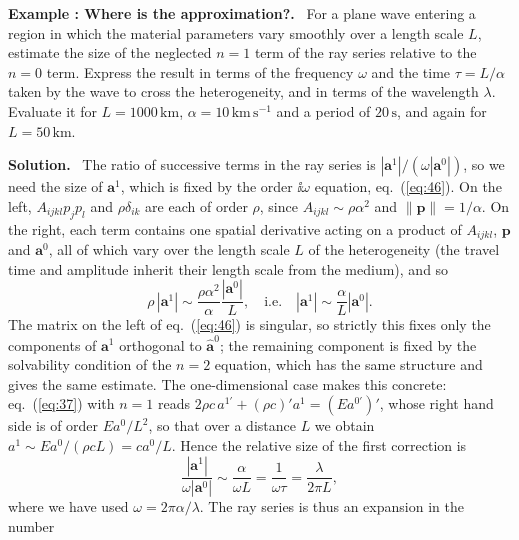 \documentclass[a4paper,12pt]{paper}
\newcounter{example}
\renewenvironment{example}[1]{%
  \refstepcounter{example}%
  \begin{mdframed}[linewidth=1pt,innertopmargin=6pt,innerbottommargin=6pt]%
  \noindent\textbf{Example \theexample: #1.}\ }{%
  \end{mdframed}}
\newenvironment{solution}{\par\noindent\textbf{Solution.}\ }{\par\medskip}
\begin{document}
\begin{example}{Where is the approximation?}
For a plane wave entering a region in which the material parameters vary smoothly over a length
scale $L$, estimate the size of the neglected $n=1$ term of the ray series relative to the $n=0$
term. Express the result in terms of the frequency $\omega$ and the time $\tau=L/\alpha$ taken by
the wave to cross the heterogeneity, and in terms of the wavelength $\lambda$. Evaluate it for
$L=1000\,\mathrm{km}$, $\alpha=10\,\mathrm{km\,s^{-1}}$ and a period of $20\,\mathrm{s}$, and again
for $L=50\,\mathrm{km}$.
\end{example}

\begin{solution}
The ratio of successive terms in the ray series is
$|\mathbf{a}^{1}|/(\omega|\mathbf{a}^{0}|)$, so we need the size of $\mathbf{a}^{1}$, which is
fixed by the order $\ii\omega$ equation, eq.~(\ref{eq:46}). On the left, $A_{ijkl}p_{j}p_{l}$ and
$\rho\delta_{ik}$ are each of order $\rho$, since $A_{ijkl}\sim\rho\alpha^{2}$ and
$\|\mathbf{p}\|=1/\alpha$. On the right, each term contains one spatial derivative acting on a
product of $A_{ijkl}$, $\mathbf{p}$ and $\mathbf{a}^{0}$, all of which vary over the length scale
$L$ of the heterogeneity (the travel time and amplitude inherit their length scale from the
medium), and so
\begin{equation}
\rho\,|\mathbf{a}^{1}|\sim\frac{\rho\alpha^{2}}{\alpha}\frac{|\mathbf{a}^{0}|}{L},\quad\text{i.e.}\quad
|\mathbf{a}^{1}|\sim\frac{\alpha}{L}|\mathbf{a}^{0}|.
\label{eq:53}
\end{equation}
The matrix on the left of eq.~(\ref{eq:46}) is singular, so strictly this fixes only the components of
$\mathbf{a}^{1}$ orthogonal to $\hat{\mathbf{a}}^{0}$; the remaining component is fixed by the
solvability condition of the $n=2$ equation, which has the same structure and gives the same
estimate. The one-dimensional case makes this concrete: eq.~(\ref{eq:37}) with $n=1$ reads
$2\rho c\,a^{1\prime}+(\rho c)'a^{1}=(Ea^{0\prime})'$, whose right hand side is of order
$Ea^{0}/L^{2}$, so that over a distance $L$ we obtain $a^{1}\sim Ea^{0}/(\rho cL)=ca^{0}/L$.
Hence the relative size of the first correction is
\begin{equation}
\frac{|\mathbf{a}^{1}|}{\omega|\mathbf{a}^{0}|}\sim\frac{\alpha}{\omega L}=\frac{1}{\omega\tau}=\frac{\lambda}{2\pi L},
\label{eq:54}
\end{equation}
where we have used $\omega=2\pi\alpha/\lambda$. The ray series is thus an expansion in the number

\end{solution}
\end{document}
